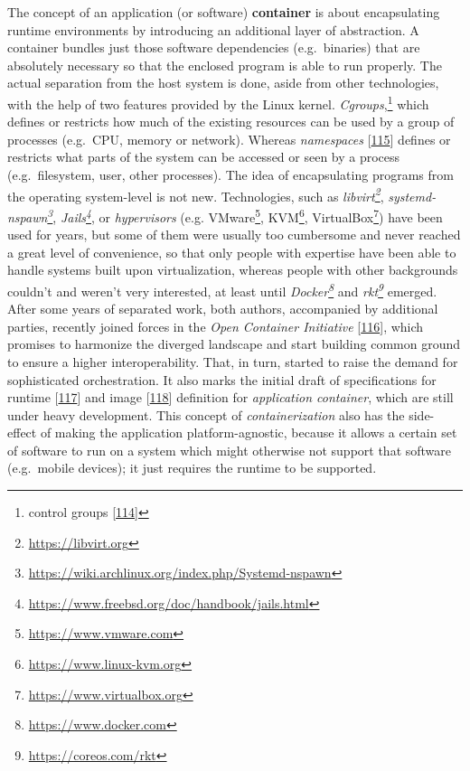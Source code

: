 \documentclass[12pt,english,a4paper,titlepage,cleardoublepage=empty,dottedtoc]{report}
\renewcommand{\href}[2]{#2\footnote{\url{#1}}}
\begin{document}
The concept of an application (or software)
\textbf{\protect\hypertarget{def--container}{}{container}} is about
encapsulating runtime environments by introducing an additional layer of
abstraction. A container bundles just those software dependencies
(e.g.~binaries) that are absolutely necessary so that the enclosed
program is able to run properly. The actual separation from the host
system is done, aside from other technologies, with the help of two
features provided by the Linux kernel. \emph{Cgroups},\footnote{control
  groups {[}\protect\hyperlink{ref-web_2015_cgroup-doc}{114}{]}} which
defines or restricts how much of the existing resources can be used by a
group of processes (e.g.~CPU, memory or network). Whereas
\emph{namespaces}
{[}\protect\hyperlink{ref-web_2016_kernel-namespace}{115}{]} defines or
restricts what parts of the system can be accessed or seen by a process
(e.g.~filesystem, user, other processes). The idea of encapsulating
programs from the operating system-level is not new. Technologies, such
as \emph{\href{https://libvirt.org}{libvirt}},
\emph{\href{https://wiki.archlinux.org/index.php/Systemd-nspawn}{systemd-nspawn}},
\emph{\href{https://www.freebsd.org/doc/handbook/jails.html}{Jails}}, or
\emph{hypervisors} (e.g. \href{https://www.vmware.com}{VMware},
\href{https://www.linux-kvm.org}{KVM},
\href{https://www.virtualbox.org}{VirtualBox}) have been used for years,
but some of them were usually too cumbersome and never reached a great
level of convenience, so that only people with expertise have been able
to handle systems built upon virtualization, whereas people with other
backgrounds couldn't and weren't very interested, at least until
\emph{\href{https://www.docker.com}{Docker}} and
\emph{\href{https://coreos.com/rkt}{rkt}} emerged. After some years of
separated work, both authors, accompanied by additional parties,
recently joined forces in the \emph{Open Container Initiative}
{[}\protect\hyperlink{ref-web_2016_open-container-initiative}{116}{]},
which promises to harmonize the diverged landscape and start building
common ground to ensure a higher interoperability. That, in turn,
started to raise the demand for sophisticated orchestration. It also
marks the initial draft of specifications for runtime
{[}\protect\hyperlink{ref-web_oci-spec_runtime}{117}{]} and image
{[}\protect\hyperlink{ref-web_oci-spec_image}{118}{]} definition for
\emph{application container}, which are still under heavy development.
This concept of \emph{containerization} also has the side-effect of
making the application platform-agnostic, because it allows a certain
set of software to run on a system which might otherwise not support
that software (e.g.~mobile devices); it just requires the runtime to be
supported.
\end{document}

